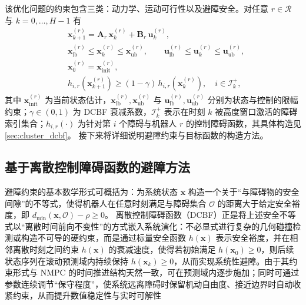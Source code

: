 该优化问题的约束包含三类：动力学、运动可行性以及避障安全。对任意 \(r\in\mathcal{R}\) 与 \(k=0,\dots,H-1\) 有
\begin{equation}
\begin{aligned}
&\mathbf{x}^{(r)}_{k+1}=\mathbf{A}_r\,\mathbf{x}^{(r)}_{k}+\mathbf{B}_r\,\mathbf{u}^{(r)}_{k},\\
&\mathbf{x}^{(r)}_{\mathrm{lb}}\le \mathbf{x}^{(r)}_k\le \mathbf{x}^{(r)}_{\mathrm{ub}},\qquad
\mathbf{u}^{(r)}_{\mathrm{lb}}\le \mathbf{u}^{(r)}_k\le \mathbf{u}^{(r)}_{\mathrm{ub}},\\
&\mathbf{x}^{(r)}_0=\mathbf{x}^{(r)}_{\mathrm{init}},\\
&h_{i,r}\!\left(\mathbf{x}^{(r)}_{k+1}\right)\ge(1-\gamma)\,
h_{i,r}\!\left(\mathbf{x}^{(r)}_{k}\right),\quad i\in\mathcal{I}^{+}_k,
\end{aligned}
\label{eq:nlp_cons_reorg}
\end{equation}
其中 \(\mathbf{x}^{(r)}_{\mathrm{init}}\) 为当前状态估计，\(\mathbf{x}^{(r)}_{\mathrm{lb}},\mathbf{x}^{(r)}_{\mathrm{ub}}\) 与 \(\mathbf{u}^{(r)}_{\mathrm{lb}},\mathbf{u}^{(r)}_{\mathrm{ub}}\) 分别为状态与控制的限幅约束；\(\gamma\in(0,1)\) 为 DCBF 衰减系数，\(\mathcal{I}^{+}_k\) 表示在时刻 \(k\) 被高度窗口激活的障碍索引集合；\(h_{i,r}(\cdot)\) 为针对第 \(i\) 个障碍与机器人 \(r\) 的控制障碍函数，其具体构造见 \autoref{sec:cluster_dcbf}。
接下来将详细说明避障约束与目标函数的构造方法。

\subsection{基于离散控制障碍函数的避障方法}\label{subsec:dcbf_form}
避障约束的基本数学形式可概括为：为系统状态 \(\mathbf{x}\) 构造一个关于“与障碍物的安全间隙”的不等式，使得机器人在任意时刻满足与障碍集合 \(\mathcal{O}\) 的距离大于给定安全裕度，即
\(
d_{\min}(\mathbf{x},\mathcal{O})-\rho \ge 0
\)。
离散控制障碍函数（DCBF）\cite{dcbf}正是将上述安全不等式以“离散时间前向不变性”的方式嵌入系统演化：不必显式进行复杂的几何碰撞检测或构造不可导的硬约束，而是通过标量安全函数 \(h(\mathbf{x})\) 表示安全裕度，并在相邻离散时刻之间约束 \(h(\mathbf{x})\) 的衰减速度，使得若初始满足 \(h(\mathbf{x}_0)\ge 0\)，则后续状态序列在滚动预测域内持续保持 \(h(\mathbf{x}_k)\ge 0\)，从而实现系统性避障。由于其约束形式与 NMPC 的时间推进结构天然一致，可在预测域内逐步施加；同时可通过参数连续调节“保守程度”，使系统远离障碍时保留机动自由度、接近边界时自动收紧约束，从而提升数值稳定性与实时可解性

